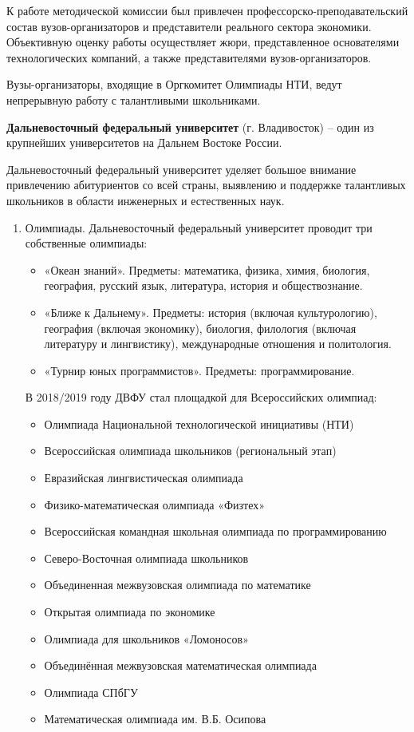 К работе методической комиссии был привлечен профессорско-преподавательский состав вузов-организаторов и представители реального сектора экономики. Объективную оценку работы осуществляет жюри, представленное основателями технологических компаний, а также представителями вузов-организаторов.  

Вузы-организаторы, входящие в Оргкомитет Олимпиады НТИ, ведут непрерывную работу с талантливыми школьниками.

\textbf{Дальневосточный федеральный университет} (г. Владивосток) – один из крупнейших университетов на Дальнем Востоке России.

Дальневосточный федеральный университет уделяет большое внимание привлечению абитуриентов со всей страны, выявлению и поддержке талантливых школьников в области инженерных и естественных наук.
\begin{enumerate}
    \item Олимпиады. Дальневосточный федеральный университет проводит три собственные олимпиады:
    \begin{itemize}
        \item «Океан знаний». Предметы: математика, физика, химия, биология, география, русский язык, литература, история и обществознание.
        \item «Ближе к Дальнему». Предметы: история (включая культурологию), география (включая экономику), биология, филология (включая литературу и лингвистику), международные отношения и политология.
        \item «Турнир юных программистов». Предметы: программирование.
    \end{itemize}

    В 2018/2019 году ДВФУ стал площадкой для Всероссийских олимпиад:
    \begin{itemize}
        \item Олимпиада Национальной технологической инициативы (НТИ)
        \item Всероссийская олимпиада школьников (региональный этап)
        \item Евразийская лингвистическая олимпиада
        \item Физико-математическая олимпиада «Физтех»
        \item Всероссийская командная школьная олимпиада по программированию
        \item Северо-Восточная олимпиада школьников
        \item Объединенная межвузовская олимпиада по математике
        \item Открытая олимпиада по экономике
        \item Олимпиада для школьников «Ломоносов»
        \item Объединённая межвузовская математическая олимпиада
        \item Олимпиада СПбГУ
        \item Математическая олимпиада им. В.Б. Осипова 
    \end{itemize}


\end{enumerate}
